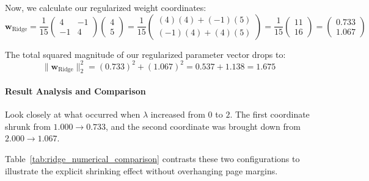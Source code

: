 \documentclass{article}
\begin{document}
Now, we calculate our regularized weight coordinates:
\begin{equation}
\mathbf{w}_{\text{Ridge}} = \frac{1}{15}\begin{pmatrix} 4 & -1 \\ -1 & 4 \end{pmatrix} \begin{pmatrix} 4 \\ 5 \end{pmatrix} = \frac{1}{15}\begin{pmatrix} (4)(4) + (-1)(5) \\ (-1)(4) + (4)(5) \end{pmatrix} = \frac{1}{15}\begin{pmatrix} 11 \\ 16 \end{pmatrix} = \begin{pmatrix} 0.733 \\ 1.067 \end{pmatrix}
\end{equation}

The total squared magnitude of our regularized parameter vector drops to:
\begin{equation}
\|\mathbf{w}_{\text{Ridge}}\|_2^2 = (0.733)^2 + (1.067)^2 = 0.537 + 1.138 = 1.675
\end{equation}

\paragraph{Result Analysis and Comparison}
Look closely at what occurred when $\lambda$ increased from $0$ to $2$. The first coordinate shrunk from $1.000 \to 0.733$, and the second coordinate was brought down from $2.000 \to 1.067$. 

Table~\ref{tab:ridge_numerical_comparison} contrasts these two configurations to illustrate the explicit shrinking effect without overhanging page margins.

\begin{table}[htbp]
\centering
\small
\renewcommand{\arraystretch}{1.3}
\caption{Mathematical Compression of Parameters via Ridge Regularization}
\label{tab:ridge_numerical_comparison}
\end{table}
\end{document}
